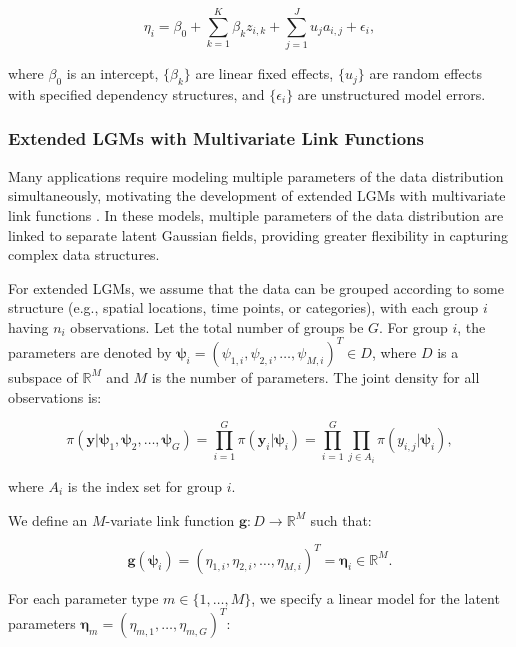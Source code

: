 \begin{equation}
    \eta_i = \beta_0 + \sum_{k=1}^K \beta_k z_{i,k} + \sum_{j=1}^J u_j a_{i,j} + \epsilon_i,
\end{equation}

where $\beta_0$ is an intercept, $\{\beta_k\}$ are linear fixed effects, $\{u_j\}$ are random effects with specified dependency structures, and $\{\epsilon_i\}$ are unstructured model errors.

\subsubsection{Extended LGMs with Multivariate Link Functions} \label{subsubsec:ext-lgm}
Many applications require modeling multiple parameters of the data distribution simultaneously, motivating the development of extended LGMs with multivariate link functions \citep{geirsson2020lgm}. In these models, multiple parameters of the data distribution are linked to separate latent Gaussian fields, providing greater flexibility in capturing complex data structures.

For extended LGMs, we assume that the data can be grouped according to some structure (e.g., spatial locations, time points, or categories), with each group $i$ having $n_i$ observations. Let the total number of groups be $G$. For group $i$, the parameters are denoted by $\boldsymbol{\psi}_i = (\psi_{1,i}, \psi_{2,i}, \ldots, \psi_{M,i})^T \in D$, where $D$ is a subspace of $\mathbb{R}^M$ and $M$ is the number of parameters. The joint density for all observations is:

\begin{equation}
    \pi(\mathbf{y}|\boldsymbol{\psi}_1, \boldsymbol{\psi}_2, \ldots, \boldsymbol{\psi}_G) = \prod_{i=1}^G \pi(\mathbf{y}_i|\boldsymbol{\psi}_i) = \prod_{i=1}^G \prod_{j \in A_i} \pi(y_{i,j}|\boldsymbol{\psi}_i),
\end{equation}

where $A_i$ is the index set for group $i$.

We define an $M$-variate link function $\mathbf{g}: D \rightarrow \mathbb{R}^M$ such that:

\begin{equation}
    \mathbf{g}(\boldsymbol{\psi}_i) = (\eta_{1,i}, \eta_{2,i}, \ldots, \eta_{M,i})^T = \boldsymbol{\eta}_i \in \mathbb{R}^M.
\end{equation}

For each parameter type $m \in \{1, \ldots, M\}$, we specify a linear model for the latent parameters $\boldsymbol{\eta}_m = (\eta_{m,1}, \ldots, \eta_{m,G})^T$:

